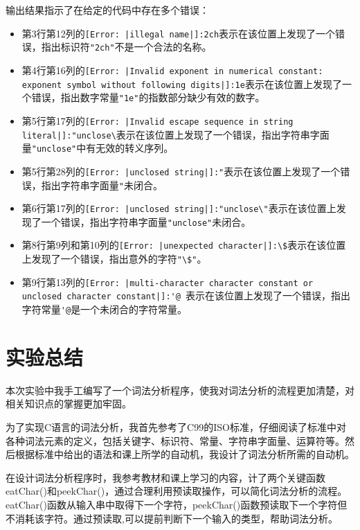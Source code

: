 \documentclass[lang=cn,11pt,a4paper]{elegantpaper}
\begin{document}
输出结果指示了在给定的代码中存在多个错误：
\begin{itemize}
    \item 第3行第12列的\lstinline[language=ErrorLanguage]{[Error: |illegal name|]:2ch}表示在该位置上发现了一个错误，指出标识符\lstinline{"2ch"}不是一个合法的名称。
    \item 第4行第16列的\lstinline[language=ErrorLanguage]{[Error: |Invalid exponent in numerical constant: exponent symbol without following digits|]:1e}表示在该位置上发现了一个错误，指出数字常量\lstinline{"1e"}的指数部分缺少有效的数字。
    \item 第5行第17列的\lstinline[language=ErrorLanguage]{[Error: |Invalid escape sequence in string literal|]:"unclose\}表示在该位置上发现了一个错误，指出字符串字面量\lstinline{"unclose"}中有无效的转义序列。
    \item 第5行第28列的\lstinline[language=ErrorLanguage]{[Error: |unclosed string|]:"}表示在该位置上发现了一个错误，指出字符串字面量\lstinline{"}未闭合。
    \item 第6行第17列的\lstinline[language=ErrorLanguage]{[Error: |unclosed string|]:"unclose\"}表示在该位置上发现了一个错误，指出字符串字面量\lstinline{"unclose"}未闭合。
    \item 第8行第9列和第10列的\lstinline[language=ErrorLanguage]{[Error: |unexpected character|]:\$}表示在该位置上发现了一个错误，指出意外的字符\lstinline{"\$"}。
    \item 第9行第13列的\lstinline[language=ErrorLanguage]{[Error: |multi-character character constant or unclosed character constant|]:'@ }表示在该位置上发现了一个错误，指出字符常量\lstinline{'@}是一个未闭合的字符常量。
\end{itemize}

\section{实验总结}

本次实验中我手工编写了一个词法分析程序，使我对词法分析的流程更加清楚，对相关知识点的掌握更加牢固。

为了实现C语言的词法分析，我首先参考了C99的ISO标准，仔细阅读了标准中对各种词法元素的定义，包括关键字、标识符、常量、字符串字面量、运算符等。然后根据标准中给出的语法和课上所学的自动机，我设计了词法分析所需的自动机。

在设计词法分析程序时，我参考教材和课上学习的内容，计了两个关键函数eatChar()和peekChar()，通过合理利用预读取操作，可以简化词法分析的流程。eatChar()函数从输入串中取得下一个字符，peekChar()函数预读取下一个字符但不消耗该字符。通过预读取,可以提前判断下一个输入的类型，帮助词法分析。
\end{document}
